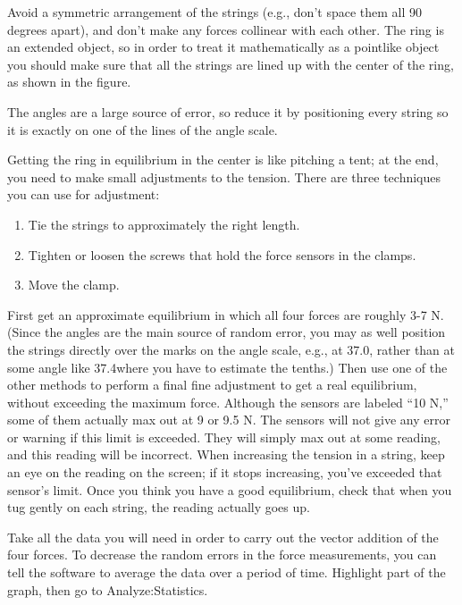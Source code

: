 
Avoid a symmetric arrangement of
the strings (e.g., don't space them all 90 degrees apart), and
don't make any forces collinear with each other. 
The ring is an extended object, so in order to treat it
mathematically as a pointlike object you should make sure
that all the strings are lined up with the center of the
ring, as shown in the figure.

The angles are a large source of error, so reduce it by positioning every string so it is exactly 
on one of the lines of the angle scale.

Getting the ring in equilibrium in the center is like pitching a tent; at the end, you need
to make small adjustments to the tension. There are three techniques you can use for
adjustment:

\begin{enumerate}
\item Tie the strings to approximately the right length.
\item Tighten or loosen the screws that hold the force sensors in the clamps.
\item Move the clamp.
\end{enumerate}

First get an approximate
equilibrium in which all four forces are roughly 3-7 N. (Since the angles are the main source
of random error, you may as well position the strings directly over the marks on the angle scale,
e.g., at 37.0\degunit, rather than at some angle like 37.4\degunit where you have to estimate the tenths.)
Then use one of the other methods to
perform a final fine adjustment to get a real equilibrium,
without exceeding the maximum force.
Although the sensors are labeled ``10 N,'' some of them actually max out at 9 or 9.5 N.
The sensors will not give any
error or warning if this limit is exceeded. They will simply max out at some
reading, and this reading will be incorrect. When increasing the tension in a string, keep an eye
on the reading on the screen; if it stops increasing, you've exceeded that sensor's limit.
Once you think you have a good equilibrium, check that when you tug gently on each string, the
reading actually goes up.

Take all the data you will need in order to carry out the vector addition of the four forces.
To decrease the random errors in the force measurements, you can tell the software to average
the data over a period of time. Highlight part of the graph, then go to Analyze:Statistics.

